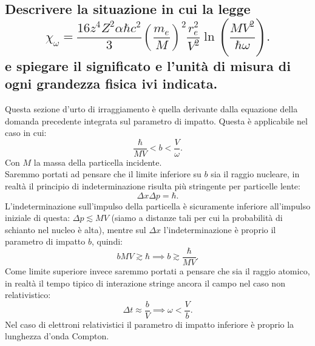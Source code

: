 \subsection[\hspace{1mm} Sezione d'urto di irraggiamento per schermaggio incompleto]{Descrivere la situazione in cui la legge
	\[
		\chi_{\omega}=\frac{16 z^4 Z^2 \alpha \hbar c^2}{3} \left( \frac{m_e}{M} \right)^2 \frac{r_e^2}{V^2} \ln\left( \frac{MV^2}{\hbar \omega} \right) 
	.\] 
e spiegare il significato e l'unità di misura di ogni grandezza fisica ivi indicata.
}\label{sec:4.a.14}
Questa sezione d'urto di irraggiamento è quella derivante dalla equazione della domanda precedente integrata sul parametro di impatto. Questa è applicabile nel caso in cui: 
\[
	\frac{\hbar}{M V} < b < \frac{V}{\omega}
.\] 
Con $M$ la massa della particella incidente.\\
Saremmo portati ad pensare che il limite inferiore su $b$ sia il raggio nucleare, in realtà il principio di indeterminazione risulta più stringente per particelle lente:
\[
	\Delta x \Delta p = \hbar 
.\] 
L'indeterminazione sull'impulso della particella è sicuramente inferiore all'impulso iniziale di questa: $\Delta p \lesssim MV$ (siamo a distanze tali per cui la probabilità di schianto nel nucleo è alta), mentre sul $\Delta x$ l'indeterminazione è proprio il parametro di impatto $b$, quindi:
\[
	b MV \gtrsim \hbar \implies b \gtrsim \frac{\hbar}{MV}
.\] 
Come limite superiore invece saremmo portati a pensare che sia il raggio atomico, in realtà il tempo tipico di interazione stringe ancora il campo nel caso non relativistico:
\[
	\Delta t \approx \frac{b}{V} \implies \omega < \frac{V}{b} 
.\] 
Nel caso di elettroni relativistici il parametro di impatto inferiore è proprio la lunghezza d'onda Compton.

